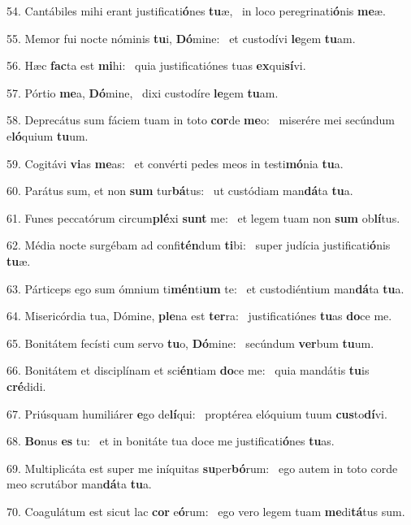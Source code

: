 54. Cantábiles mihi erant justificati\textbf{ó}nes \textbf{tu}æ, \ast\  in loco peregrinati\textbf{ó}nis \textbf{me}æ.\

55. Memor fui nocte nóminis \textbf{tu}i, \textbf{Dó}mine: \ast\  et custodívi \textbf{le}gem \textbf{tu}am.\

56. Hæc \textbf{fac}ta est \textbf{mi}hi: \ast\  quia justificatiónes tuas \textbf{ex}qui\textbf{sí}vi.\

57. Pórtio \textbf{me}a, \textbf{Dó}mine, \ast\  dixi custodíre \textbf{le}gem \textbf{tu}am.\

58. Deprecátus sum fáciem tuam in toto \textbf{cor}de \textbf{me}o: \ast\  miserére mei secúndum e\textbf{ló}quium \textbf{tu}um.\

59. Cogitávi \textbf{vi}as \textbf{me}as: \ast\  et convérti pedes meos in testi\textbf{mó}nia \textbf{tu}a.\

60. Parátus sum, et non \textbf{sum} tur\textbf{bá}tus: \ast\  ut custódiam man\textbf{dá}ta \textbf{tu}a.\

61. Funes peccatórum circum\textbf{plé}xi \textbf{sunt} me: \ast\  et legem tuam non \textbf{sum} ob\textbf{lí}tus.\

62. Média nocte surgébam ad confi\textbf{tén}dum \textbf{ti}bi: \ast\  super judícia justificati\textbf{ó}nis \textbf{tu}æ.\

63. Párticeps ego sum ómnium ti\textbf{mén}ti\textbf{um} te: \ast\  et custodiéntium man\textbf{dá}ta \textbf{tu}a.\

64. Misericórdia tua, Dómine, \textbf{ple}na est \textbf{ter}ra: \ast\  justificatiónes \textbf{tu}as \textbf{do}ce me.\

65. Bonitátem fecísti cum servo \textbf{tu}o, \textbf{Dó}mine: \ast\  secúndum \textbf{ver}bum \textbf{tu}um.\

66. Bonitátem et disciplínam et sci\textbf{én}tiam \textbf{do}ce me: \ast\  quia mandátis \textbf{tu}is \textbf{cré}didi.\

67. Priúsquam humiliárer \textbf{e}go de\textbf{lí}qui: \ast\  proptérea elóquium tuum \textbf{cus}to\textbf{dí}vi.\

68. \textbf{Bo}nus \textbf{es} tu: \ast\  et in bonitáte tua doce me justificati\textbf{ó}nes \textbf{tu}as.\

69. Multiplicáta est super me iníquitas \textbf{su}per\textbf{bó}rum: \ast\  ego autem in toto corde meo scrutábor man\textbf{dá}ta \textbf{tu}a.\

70. Coagulátum est sicut lac \textbf{cor} e\textbf{ó}rum: \ast\  ego vero legem tuam \textbf{me}di\textbf{tá}tus sum.\

